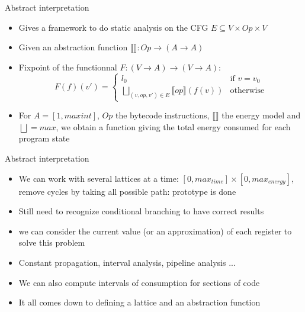 \documentclass{beamer}
\begin{document}
\begin{frame}{Abstract interpretation}
\begin{itemize}
    
    \item Gives a framework to do static analysis on the CFG $E\subseteq V \times Op \times V$
    \pause 
    \item Given an abstraction function $\llbracket\rrbracket: Op \rightarrow (A\rightarrow A)$
    \pause 
    \item Fixpoint of the functionnal $F: (V\rightarrow A) \rightarrow (V\rightarrow A)$: \\
    \begin{equation}
        F(f)(v')= \begin{cases}
            l_0 & \text{if } v=v_0\\
            \bigsqcup\limits_{(v,op,v')\in E} \llbracket op \rrbracket (f(v)) & \text{otherwise}
        \end{cases}
    \end{equation}
    \pause 
    \item For $A= [1,maxint]$, $Op$ the bytecode instructions, $\llbracket \rrbracket$ the energy model and $\bigsqcup = max$, we obtain a function giving the total energy consumed for each program state 
\end{itemize}
    

\end{frame}

\begin{frame}{Abstract interpretation}
    
    \begin{itemize}
        \item We can work with several lattices at a time: $[0,max_{time}] \times [0,max_{energy}] $, remove cycles by taking all possible path: prototype is done
        \pause 
        \item Still need to recognize conditional branching to have correct results
        \pause 
        \item we can consider the current value (or an approximation) of each register to solve this problem
        \pause 
        \item Constant propagation, interval analysis, pipeline analysis ...
        \pause 
        \item We can also compute intervals of consumption for sections of code 
        \pause 
        \item It all comes down to defining a lattice and an abstraction function
    \end{itemize}
\end{frame}
\end{document}
